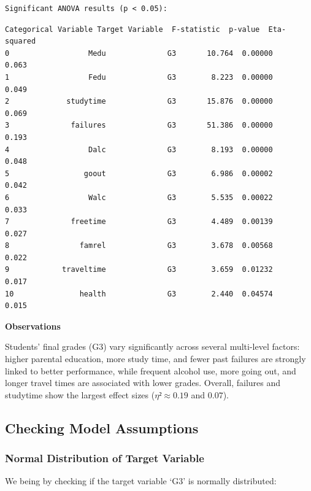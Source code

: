 \documentclass[9pt]{article}
\begin{document}
    \begin{Verbatim}[commandchars=\\\{\}]
Significant ANOVA results (p < 0.05):
    \end{Verbatim}

    
    \begin{Verbatim}[commandchars=\\\{\}]
   Categorical Variable Target Variable  F-statistic  p-value  Eta-squared
0                  Medu              G3       10.764  0.00000        0.063
1                  Fedu              G3        8.223  0.00000        0.049
2             studytime              G3       15.876  0.00000        0.069
3              failures              G3       51.386  0.00000        0.193
4                  Dalc              G3        8.193  0.00000        0.048
5                 goout              G3        6.986  0.00002        0.042
6                  Walc              G3        5.535  0.00022        0.033
7              freetime              G3        4.489  0.00139        0.027
8                famrel              G3        3.678  0.00568        0.022
9            traveltime              G3        3.659  0.01232        0.017
10               health              G3        2.440  0.04574        0.015
    \end{Verbatim}

    
    \textbf{Observations}

Students' final grades (G3) vary significantly across several
multi-level factors: higher parental education, more study time, and
fewer past failures are strongly linked to better performance, while
frequent alcohol use, more going out, and longer travel times are
associated with lower grades. Overall, failures and studytime show the
largest effect sizes (\(η² \approx 0.19\) and \(0.07\)).

    \hypertarget{checking-model-assumptions}{%
\subsection{Checking Model
Assumptions}\label{checking-model-assumptions}}

    \hypertarget{normal-distribution-of-target-variable}{%
\subsubsection{Normal Distribution of Target
Variable}\label{normal-distribution-of-target-variable}}

We being by checking if the target variable `G3' is normally
distributed:
\end{document}
